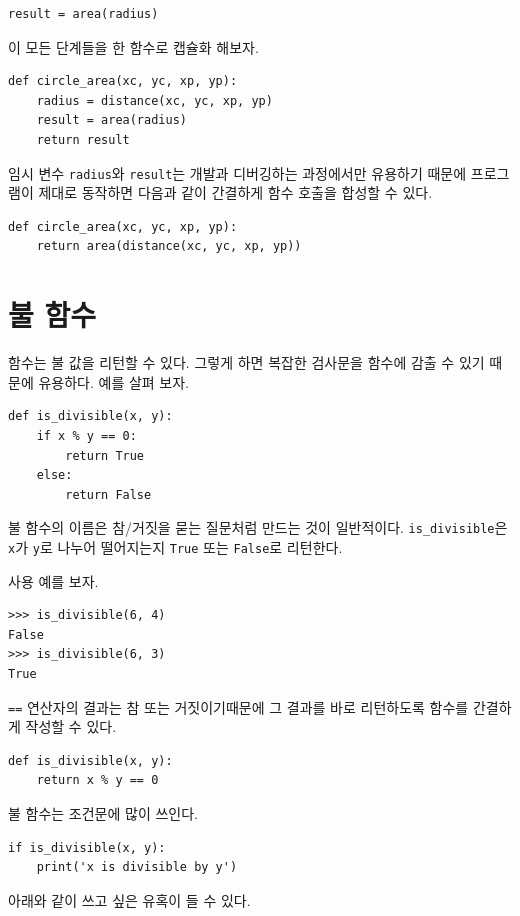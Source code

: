 \documentclass[10pt]{book}
\begin{document}
\begin{verbatim}
result = area(radius)
\end{verbatim}
%
이 모든 단계들을 한 함수로 캡슐화 해보자.

\begin{verbatim}
def circle_area(xc, yc, xp, yp):
    radius = distance(xc, yc, xp, yp)
    result = area(radius)
    return result
\end{verbatim}
%
임시 변수 {\tt radius}와 {\tt result}는 개발과 디버깅하는 과정에서만
유용하기 때문에 프로그램이 제대로 동작하면 다음과 같이 간결하게 함수
호출을 합성할 수 있다.

\begin{verbatim}
def circle_area(xc, yc, xp, yp):
    return area(distance(xc, yc, xp, yp))
\end{verbatim}
%

\section{불 함수}
\label{boolean}

함수는 불 값을 리턴할 수 있다.  그렇게 하면 복잡한 검사문을 함수에 감출
수 있기 때문에 유용하다.
예를 살펴 보자.

\begin{verbatim}
def is_divisible(x, y):
    if x % y == 0:
        return True
    else:
        return False
\end{verbatim}
%
불 함수의 이름은 참/거짓을 묻는 질문처럼 만드는 것이 일반적이다.
\verb"is_divisible"은 {\tt x}가 {\tt y}로 나누어 떨어지는지 {\tt True}
또는 {\tt False}로 리턴한다.

사용 예를 보자. 

\begin{verbatim}
>>> is_divisible(6, 4)
False
>>> is_divisible(6, 3)
True
\end{verbatim}
%
{\tt ==} 연산자의 결과는 참 또는 거짓이기때문에 그 결과를 바로
리턴하도록 함수를 간결하게 작성할 수 있다.


\begin{verbatim}
def is_divisible(x, y):
    return x % y == 0
\end{verbatim}
%
불 함수는 조건문에 많이 쓰인다. 

\begin{verbatim}
if is_divisible(x, y):
    print('x is divisible by y')
\end{verbatim}
%
아래와 같이 쓰고 싶은 유혹이 들 수 있다. 
\end{document}
